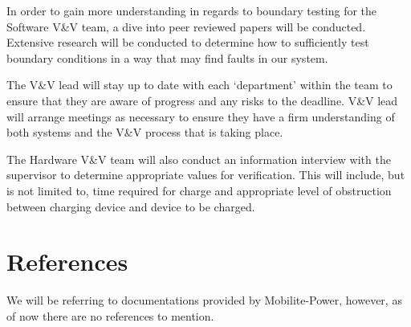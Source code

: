 \documentclass[12pt, titlepage]{article}
\begin{document}
In order to gain more understanding in regards to boundary testing for the Software V\&V team, a dive into peer reviewed papers will be conducted. Extensive research will be conducted to determine how to sufficiently test boundary conditions in a way that may find faults in our system.

The V\&V lead will stay up to date with each ‘department’ within the team to ensure that they are aware of progress and any risks to the deadline. V\&V lead will arrange meetings as necessary to ensure they have a firm understanding of both systems and the V\&V process that is taking place.

The Hardware V\&V team will also conduct an information interview with the supervisor to determine appropriate values for verification. This will include, but is not limited to, time required for charge and appropriate level of obstruction between charging device and device to be charged. 


\section*{References}
We will be referring to documentations provided by Mobilite-Power, however, as of now there are no references to mention.
\end{document}
